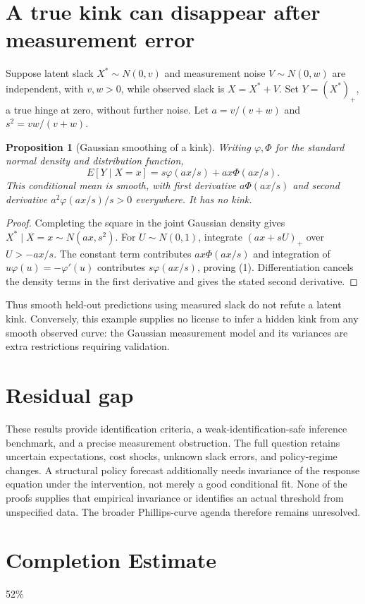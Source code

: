 \documentclass[11pt]{article}
\newtheorem{proposition}[theorem]{Proposition}
\theoremstyle{definition}
\begin{document}
\section*{A true kink can disappear after measurement error}
Suppose latent slack $X^*\sim N(0,v)$ and measurement noise $V\sim N(0,w)$ are independent, with $v,w>0$, while observed slack is $X=X^*+V$. Set $Y=(X^*)_+$, a true hinge at zero, without further noise. Let $a=v/(v+w)$ and $s^2=vw/(v+w)$.
\begin{proposition}[Gaussian smoothing of a kink]
Writing $\varphi,\Phi$ for the standard normal density and distribution function,
\[
 E[Y\mid X=x]=s\varphi(ax/s)+ax\Phi(ax/s).
 \tag{1}
\]
This conditional mean is smooth, with first derivative $a\Phi(ax/s)$ and second derivative $a^2\varphi(ax/s)/s>0$ everywhere. It has no kink.
\end{proposition}
\begin{proof}
Completing the square in the joint Gaussian density gives $X^*\mid X=x\sim N(ax,s^2)$. For $U\sim N(0,1)$, integrate $(ax+sU)_+$ over $U>-ax/s$. The constant term contributes $ax\Phi(ax/s)$ and integration of $u\varphi(u)=-\varphi'(u)$ contributes $s\varphi(ax/s)$, proving (1). Differentiation cancels the density terms in the first derivative and gives the stated second derivative.
\end{proof}
Thus smooth held-out predictions using measured slack do not refute a latent kink. Conversely, this example supplies no license to infer a hidden kink from any smooth observed curve: the Gaussian measurement model and its variances are extra restrictions requiring validation.

\section*{Residual gap}
These results provide identification criteria, a weak-identification-safe inference benchmark, and a precise measurement obstruction. The full question retains uncertain expectations, cost shocks, unknown slack errors, and policy-regime changes. A structural policy forecast additionally needs invariance of the response equation under the intervention, not merely a good conditional fit. None of the proofs supplies that empirical invariance or identifies an actual threshold from unspecified data. The broader Phillips-curve agenda therefore remains unresolved.

\section{Completion Estimate}
52\%
\end{document}
